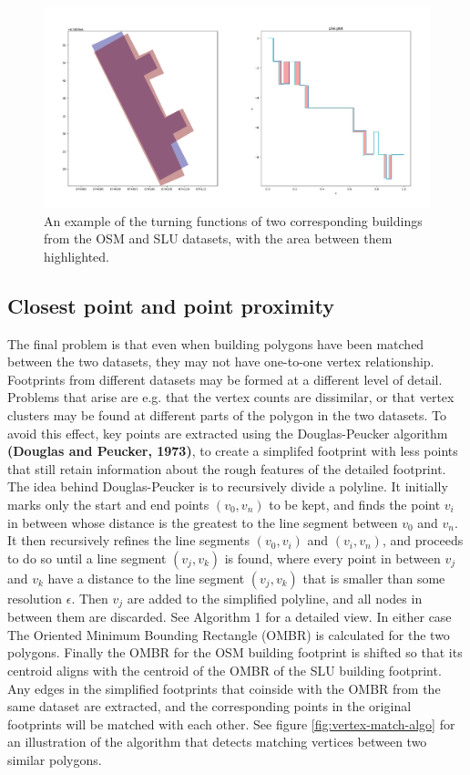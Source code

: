 \documentclass{kththesis}
\begin{document}
\begin{figure}[H]
    \centering
    \includegraphics[width=\textwidth,height=0.5\textheight,keepaspectratio]{img_turn_function_diff_filled}
    \caption{An example of the turning functions of two corresponding buildings from the OSM and SLU datasets, with the area between them highlighted.}
    \label{fig:turning-function-compare}
\end{figure}

\subsection{Closest point and point proximity}

The final problem is that even when building polygons have been matched between the two datasets, they may not have one-to-one vertex relationship.
Footprints from different datasets may be formed at a different level of detail.
Problems that arise are e.g. that the vertex counts are dissimilar, or that vertex clusters may be found at different parts of the polygon in the two datasets.
To avoid this effect, key points are extracted using the Douglas-Peucker algorithm \textbf{(Douglas and Peucker, 1973)}, to create a simplifed footprint with less points that still retain information about the rough features of the detailed footprint.
The idea behind Douglas-Peucker is to recursively divide a polyline.
It initially marks only the start and end points $(v_0, v_n)$ to be kept, and finds the point $v_i$ in between whose distance is the greatest to the line segment between $v_0$ and $v_n$.
It then recursively refines the line segments $(v_0, v_i)$ and $(v_i, v_n)$, and proceeds to do so until a line segment $(v_j, v_k)$ is found, where every point in between $v_j$ and $v_k$ have a distance to the line segment $(v_j, v_k)$ that is smaller than some resolution $\epsilon$.
Then $v_j$ are added to the simplified polyline, and all nodes in between them are discarded.
See Algorithm 1 for a detailed view.
In either case The Oriented Minimum Bounding Rectangle (OMBR) is calculated for the two polygons.
Finally the OMBR for the OSM building footprint is shifted so that its centroid aligns with the centroid of the OMBR of the SLU building footprint.
Any edges in the simplified footprints that coinside with the OMBR from the same dataset are extracted, and the corresponding points in the original footprints will be matched with each other.
See figure \ref{fig:vertex-match-algo} for an illustration of the algorithm that detects matching vertices between two similar polygons.
\end{document}
